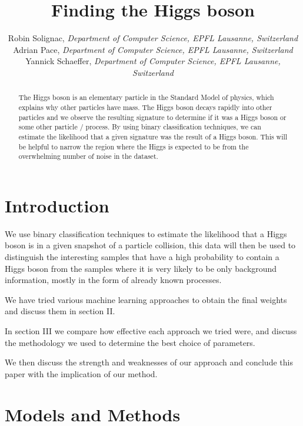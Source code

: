 \documentclass[10pt,conference,compsocconf]{IEEEtran}
\begin{document}
\title{Finding the Higgs boson}

\author{
  Robin Solignac,
  \textit{Department of Computer Science, EPFL Lausanne, Switzerland}\\
  Adrian Pace,
  \textit{Department of Computer Science, EPFL Lausanne, Switzerland}\\
  Yannick Schaeffer,
  \textit{Department of Computer Science, EPFL Lausanne, Switzerland}
}

\maketitle

\begin{abstract}
 The Higgs boson is an elementary particle in the Standard Model of physics, which explains why other particles have mass. The Higgs boson decays rapidly into other particles and we observe the resulting signature to determine if it was a Higgs boson or some other particle / process. By using binary classification techniques, we can estimate the likelihood that a given signature was the result of a Higgs boson. This will be helpful to narrow the region where the Higgs is expected to be from the overwhelming number of noise in the dataset.
\end{abstract}

\section{Introduction}
We use binary classification techniques to estimate the likelihood that a Higgs boson is in a given snapshot of a particle collision, this data will then be used to distinguish the interesting samples that have a high probability to contain a Higgs boson from the samples where it is very likely to be only background information, mostly in the form of already known processes.

We have tried various machine learning approaches to obtain the final weights and discuss them in section II.

In section III we compare how effective each approach we tried were, and discuss the methodology we used to determine the best choice of parameters.

We then discuss the strength and weaknesses of our approach and conclude this paper with the implication of our method.

\section{Models and Methods}
\end{document}
